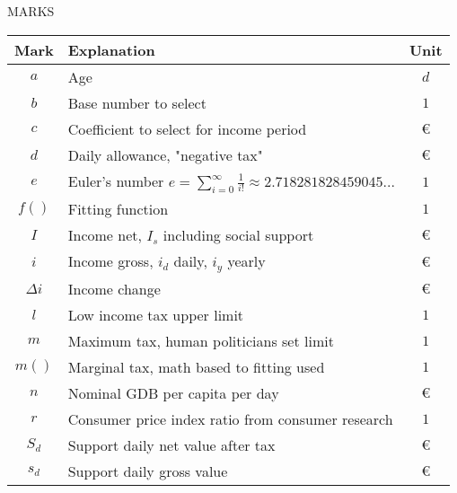 %
%
%
MARKS
\label{marks}

\begin{center}
\begin{supertabular}{ c l c }
  Mark	 & Explanation					&  Unit		 \\
\hline
$ a	$& Age						&$ d		$\\
$ b	$& Base number to select			&$ 1		$\\
$ c	$& Coefficient to select for income period	&$ \euro	$\\
$ d	$& Daily allowance, "negative tax"		&$ \euro	$\\
$e$&Euler's number $e=\sum_{i=0}^{\infty}\frac1{i!}\approx2.718281828459045...$&$1$\\
$ f()	$& Fitting function				&$ 1		$\\
$ I	$& Income net, $I_s$ including social support	&$ \euro	$\\
$ i	$& Income gross, $i_d$ daily, $i_y$ yearly	&$ \euro	$\\
$\Delta i$& Income change				&$ \euro	$\\
$ l	$& Low income tax upper limit			&$ 1		$\\
$ m	$& Maximum tax, human politicians set limit	&$ 1		$\\
$ m()	$& Marginal tax, math based to fitting used	&$ 1		$\\
$ n	$& Nominal GDB per capita per day		&$ \euro	$\\
$ r	$& Consumer price index ratio from consumer research&$ 1	$\\
$ S_d	$& Support daily net value after tax		&$ \euro	$\\
$ s_d	$& Support daily gross value			&$ \euro	$\\

\end{supertabular}
\end{center}
